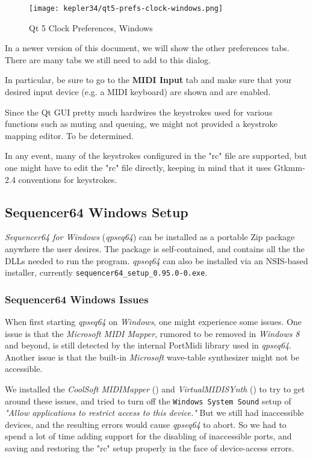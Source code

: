 \begin{figure}[H]
   \centering 
   \texttt{[image: kepler34/qt5-prefs-clock-windows.png]}
   \caption{Qt 5 Clock Preferences, Windows}
   \label{fig:qt5_prefs_clock_windows}
\end{figure}

   In a newer version of this document, we will show the other preferences
   tabs.  There are many tabs we still need to add to this dialog.

   In particular, be sure to go to the \textbf{MIDI Input} tab and
   make sure that your desired input device (e.g. a MIDI keyboard) are shown
   and are enabled.

   Since the Qt GUI pretty much hardwires the keystrokes used for various
   functions such as muting and queuing, we might not provided a keystroke
   mapping editor.  To be determined.

   In any event, many of the keystrokes configured in the "rc" file are
   supported, but one might have to edit the "rc" file directly, keeping
   in mind that it uses Gtkmm-2.4 conventions for keystrokes.

\subsection{Sequencer64 Windows Setup}
\label{subsec:qt_portmidi_windows_setup}

   \textsl{Sequencer64 for Windows} (\textsl{qpseq64}) can be installed
   as a portable Zip package anywhere the user desires.  The package is
   self-contained, and contains all the the DLLs needed to run the program.
   \textsl{qpseq64} can also be installed via an NSIS-based installer,
   currently \texttt{sequencer64\_setup\_0.95.0-0.exe}.

\subsubsection{Sequencer64 Windows Issues}
\label{subsubsec:qt_portmidi_windows_setup_issues}

    When first starting \textsl{qpseq64} on \textsl{Windows}, one might
    experience some issues.  One issue is that the \textsl{Microsoft MIDI
    Mapper}, rumored to be removed in \textsl{Windows 8} and beyond, is still
    detected by the internal PortMidi library used in \textsl{qpseq64}.
    Another issue is that the built-in \textsl{Microsoft} wave-table
    synthesizer might not be accessible.

    We installed the
    \textsl{CoolSoft MIDIMapper} (\cite{midimapper}) and
    \textsl{VirtualMIDISYnth} (\cite{midisynth}) to try to get
    around these issues, and tried to turn off the
    \texttt{Windows System Sound} setup of
    \textsl{"Allow applications to restrict access to this device."}
    But we still had
    inaccessible devices, and the resulting errors would cause
    \textsl{qpseq64} to
    abort.  So we had to spend a lot of time adding support for
    the disabling of
    inaccessible ports, and saving and restoring the "rc" setup properly
    in the face of device-access errors.

